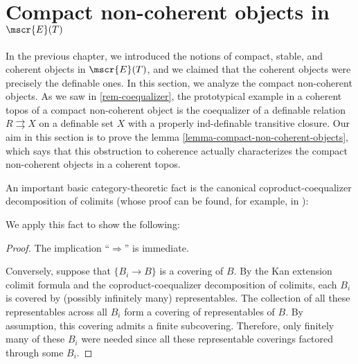 
\label{chap:ultraproduct-coherence}
\section{Compact non-coherent objects in $\mscr{E}(T)$}

In the previous chapter, we introduced the notions of compact, stable, and coherent objects in $\mscr{E}(T)$, and we claimed that the coherent objects were precisely the definable ones. In this section, we analyze the compact non-coherent objects. As we saw in \ref{rem-coequalizer}, the prototypical example in a coherent topos of a compact non-coherent object is the coequalizer of a definable relation $R \rightrightarrows X$ on a definable set $X$ with a properly ind-definable transitive closure. Our aim in this section is to prove the lemma \ref{lemma-compact-non-coherent-objects}, which says that this obstruction to coherence actually characterizes the compact non-coherent objects in a coherent topos.

An important basic category-theoretic fact is the canonical coproduct-coequalizer decomposition of colimits (whose proof can be found, for example, in \cite{maclane-cwm}):


We apply this fact to show the following:


\begin{proof}
  The implication ``$\Rightarrow$'' is immediate.

  Conversely, suppose that $\{B_i \to B\}$ is a covering of $B$. By the Kan extension colimit formula and the coproduct-coequalizer decomposition of colimits, each $B_i$ is covered by (possibly infinitely many) representables. The collection of all these representables across all $B_i$ form a covering of representables of $B$. By assumption, this covering admits a finite subcovering. Therefore, only finitely many of these $B_i$ were needed since all these representable coverings factored through some $B_i$.\end{proof}

